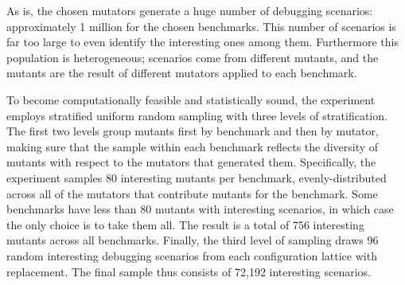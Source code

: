 

As is, the chosen mutators generate a huge number of debugging scenarios:
approximately 1 million for the chosen benchmarks. This number of scenarios is
far too large to even identify the interesting ones among them.  Furthermore
this population is heterogeneous; scenarios come from different
mutants, and the mutants are the result of different mutators applied to each
benchmark.

To become computationally feasible and statistically sound, the experiment employs
stratified uniform random sampling with three levels of stratification.
The first two levels group mutants first by benchmark and then by
mutator, making sure that the sample within each benchmark reflects the diversity of
mutants with respect to the mutators that generated them.  Specifically, the
experiment samples 80 interesting mutants per benchmark,
evenly-distributed across all of the mutators that contribute mutants for the
benchmark. Some benchmarks have less than  80 mutants with interesting scenarios,
in which case the only choice is to take them all.
The result is a total of 756 interesting mutants across all benchmarks.
Finally, the third level of sampling draws 96 random interesting debugging
scenarios from each configuration lattice with replacement. The
final sample thus consists of 72,192 interesting scenarios.


